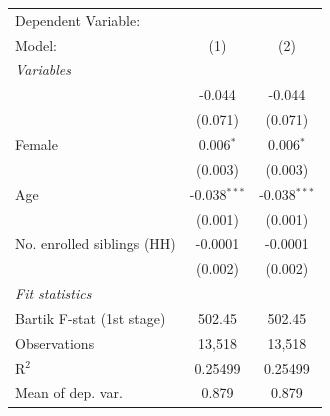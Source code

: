 \begin{tabular}{lcc}
   \tabularnewline \midrule \midrule
   Dependent Variable: & \\
   Model:                                                                & (1)            & (2)\\  
   \midrule
   \emph{Variables}\\
        & -0.044         & -0.044\\   
                                                                         & (0.071)        & (0.071)\\   
   Female                                                                & 0.006$^{*}$    & 0.006$^{*}$\\   
                                                                         & (0.003)        & (0.003)\\   
   Age                                                                   & -0.038$^{***}$ & -0.038$^{***}$\\   
                                                                         & (0.001)        & (0.001)\\   
   No. enrolled siblings (HH)                                            & -0.0001        & -0.0001\\   
                                                                         & (0.002)        & (0.002)\\   
   \midrule
   \emph{Fit statistics}\\
   Bartik F-stat (1st stage)                                     & 502.45         & 502.45\\  
   Observations                                                          & 13,518         & 13,518\\  
   R$^2$                                                                 & 0.25499        & 0.25499\\  
   Mean of dep. var.                                                     & 0.879          & 0.879\\  
\bottomrule
\end{tabular}
